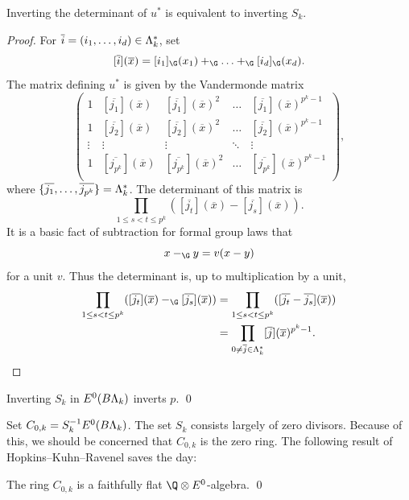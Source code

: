 \begin{lemma} \label{det}
Inverting the determinant of \(u^*\) is equivalent to inverting \(S_k\).
\end{lemma}
\begin{proof}
For \(\overline{i} = (i_1, \ldots, i_d) \in \Lambda_k^*\), set
\[
[\overline{i}](\overline{x}) = [i_1]_{\G}(x_1) +_{\G} \ldots +_{\G} [i_d]_{\G}(x_d).
\]
The matrix defining \(u^*\) is given by the Vandermonde matrix
\[
\left(
\begin{array}{ccccc}
1 & [\overline{j_1}](\overline{x}) & [\overline{j_1}](\overline{x})^2 & \ldots & [\overline{j_{1}}](\overline{x})^{p^k-1} \\
1 & [\overline{j_2}](\overline{x}) & [\overline{j_2}](\overline{x})^2 & \ldots & [\overline{j_{2}}](\overline{x})^{p^k-1}\\
\vdots & \vdots & \vdots & \ddots & \vdots \\
1 & [\overline{j_{p^k}}](\overline{x}) & [\overline{j_{p^k}}](\overline{x})^2 & \ldots & [\overline{j_{p^k}}](\overline{x})^{p^k-1}\\
\end{array} \right),
\]
where \(\{\overline{j_1},\ldots,\overline{j_{p^k}}\} = \Lambda_k^*\).
The determinant of this matrix is
\[
\prod_{1 \leq s < t \leq p^k} ([\overline{j_t}](\overline{x}) - [\overline{j_s}](\overline{x})).
\]
It is a basic fact of subtraction for formal group laws that
\[
x -_{\G} y = v(x-y)
\]
for a unit \(v\). 
Thus the determinant is, up to multiplication by a unit, 
\begin{align*}
\prod_{1 \leq s < t \leq p^k} ([\overline{j_t}](\overline{x}) -_{\G} [\overline{j_s}](\overline{x})) & = \prod_{1 \leq s < t \leq p^k} ([\overline{j_t} - \overline{j_s}](\overline{x})) \\
& = \prod_{0 \neq \overline{j} \in \Lk^*} [\overline{j}](\overline{x})^{p^k-1}.
\qedhere
\end{align*} 
\end{proof}

\begin{corollary}
Inverting \(S_k\) in \(E^0(B\Lambda_k)\) inverts \(p\).
\pushQED\qed \qedhere \popQED
\end{corollary}

Set \(C_{0,k} = S_{k}^{-1}E^0(B\Lambda_k)\).
The set \(S_k\) consists largely of zero divisors.
Because of this, we should be concerned that \(C_{0,k}\) is the zero ring.
The following result of Hopkins--Kuhn--Ravenel saves the day:

\begin{proposition}\label{CZeroIsFaithfullyFlat}
The ring \(C_{0,k}\) is a faithfully flat \(\Q \otimes E^0\)-algebra.
\pushQED\qed \qedhere \popQED
\end{proposition}

